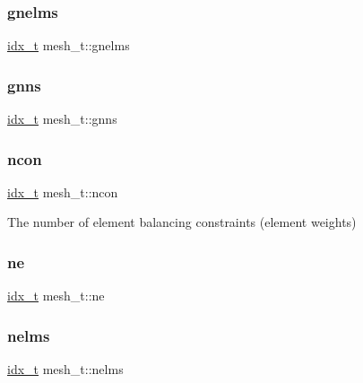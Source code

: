 \subsubsection{\texorpdfstring{gnelms}{gnelms}}
{\footnotesize\ttfamily \hyperlink{3rd_party_2parmetis-4_80_83_2metis_2include_2metis_8h_aaa5262be3e700770163401acb0150f52}{idx\+\_\+t} mesh\+\_\+t\+::gnelms}

\mbox{\label{structmesh__t_ad534138460141cd611dc0fae1baf8346}} 
\subsubsection{\texorpdfstring{gnns}{gnns}}
{\footnotesize\ttfamily \hyperlink{3rd_party_2parmetis-4_80_83_2metis_2include_2metis_8h_aaa5262be3e700770163401acb0150f52}{idx\+\_\+t} mesh\+\_\+t\+::gnns}

\mbox{\label{structmesh__t_ad18b1da90165616c622c16ce79c6907f}} 
\subsubsection{\texorpdfstring{ncon}{ncon}}
{\footnotesize\ttfamily \hyperlink{3rd_party_2parmetis-4_80_83_2metis_2include_2metis_8h_aaa5262be3e700770163401acb0150f52}{idx\+\_\+t} mesh\+\_\+t\+::ncon}

The number of element balancing constraints (element weights) \mbox{\label{structmesh__t_ac33c0c0c59858834a11754492189e231}} 
\subsubsection{\texorpdfstring{ne}{ne}}
{\footnotesize\ttfamily \hyperlink{3rd_party_2parmetis-4_80_83_2metis_2include_2metis_8h_aaa5262be3e700770163401acb0150f52}{idx\+\_\+t} mesh\+\_\+t\+::ne}

\mbox{\label{structmesh__t_ad2c11f70ee4b511bd158dbd38f46fc14}} 
\subsubsection{\texorpdfstring{nelms}{nelms}}
{\footnotesize\ttfamily \hyperlink{3rd_party_2parmetis-4_80_83_2metis_2include_2metis_8h_aaa5262be3e700770163401acb0150f52}{idx\+\_\+t} mesh\+\_\+t\+::nelms}

